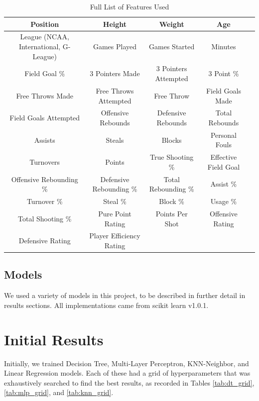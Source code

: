 \documentclass{article}
\begin{document}
\begin{table}
	\begin{center}
		\begin{tabular}{|c|c|c|c|c|} 
		\hline\hline
		Position & Height & Weight & Age \\ \hline
		League (NCAA, International, G-League) & Games Played & Games Started & Minutes \\ \hline
		Field Goal \% & 3 Pointers Made & 3 Pointers Attempted & 3 Point \% \\ \hline
		Free Throws Made & Free Throws Attempted & Free Throw & Field Goals Made \\ \hline
		Field Goals Attempted & Offensive Rebounds & Defensive Rebounds & Total Rebounds  \\ \hline
		Assists & Steals & Blocks & Personal Fouls \\ \hline
		Turnovers & Points & True Shooting \% & Effective Field Goal \\ \hline
		Offensive Rebounding \% & Defensive Rebounding \% & Total Rebounding \% & Assist \% \\ \hline
		Turnover \% & Steal \% & Block \% & Usage \% \\ \hline
		Total Shooting \% & Pure Point Rating & Points Per Shot & Offensive Rating \\ \hline
		Defensive Rating & Player Efficiency Rating & & \\ 
		\hline\hline
		\end{tabular}
	\end{center}
	\caption{Full List of Features Used}
	\label{tab:features}
\end{table}




\subsection{Models}

We used a variety of models in this project, to be described in further detail
in results sections. All implementations came from scikit learn v1.0.1.

\section{Initial Results}

Initially, we trained Decision Tree, Multi-Layer Perceptron, KNN-Neighbor, and
Linear Regression models. Each of these had a grid of hyperparameters that was
exhaustively searched to find the best results, as recorded in Tables
\ref{tab:dt_grid}, \ref{tab:mlp_grid}, and \ref{tab:knn_grid}.
\end{document}
